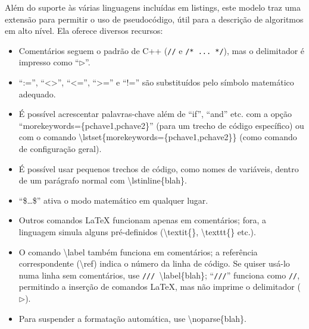Além do suporte às várias linguagens incluídas em \textsf{listings},
este modelo traz uma extensão para permitir o uso de pseudocódigo,
útil para a descrição de algoritmos em alto nível. Ela oferece
diversos recursos:

\begin{itemize}

    \item Comentários seguem o padrão de C++ (\lstinline{//} e
          \lstinline{/* ... */}), mas o delimitador é impresso
          como ``$\triangleright$''.

    \item ``:='', ``<>'', ``<='', ``>='' e ``!='' são substituídos
          pelo símbolo matemático adequado.

    \item É possível acrescentar palavras-chave além de ``if'', ``and''
          etc. com a opção ``\textsf{morekeywords=\{pchave1,\linebreak[0]{}pchave2\}}''
          (para um trecho de código específico) ou com o comando
          \textsf{\textbackslash{}lstset\{morekeywords=\linebreak[0]{}\{pchave1,pchave2\}\}}
          (como comando de configuração geral).

    \item É possível usar pequenos trechos de código, como nomes de variáveis,
          dentro de um parágrafo normal com \textsf{\textbackslash{}lstinline\{blah\}}.

    \item ``\$\dots\$'' ativa o modo matemático em qualquer lugar.

    \item Outros comandos LaTeX funcionam apenas em comentários; fora, a
          linguagem simula alguns pré-definidos (\textsf{\textbackslash{}textit\{\}},
          \textsf{\textbackslash{}texttt\{\}} etc.).

    \item O comando \textsf{\textbackslash{}label} também funciona em
          comentários; a referência correspondente (\textsf{\textbackslash{}ref})
          indica o número da linha de código. Se quiser usá-lo numa linha sem
          comentários, use \lstinline{///}~\textsf{\textbackslash{}label\{blah\}};
          ``\lstinline{///}'' funciona como \lstinline{//}, permitindo
          a inserção de comandos \LaTeX{}, mas não imprime o delimitador
          (\ensuremath{\triangleright}).

    \item Para suspender a formatação automática, use \textsf{\textbackslash{}noparse\{blah\}}.


\end{itemize}
